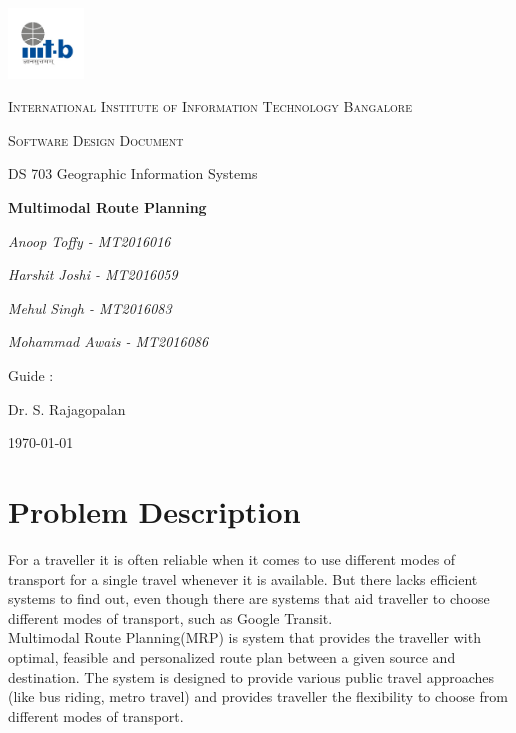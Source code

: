 \documentclass[12pt,a4paper]{article}
\begin{document}
\begin{titlepage}
	\centering
	\includegraphics[width=0.15\textwidth]{IIIT-B_logo.jpg}\par\vspace{1cm}
	{\scshape\LARGE International Institute of Information Technology Bangalore \par}
	\vspace{1cm}
	{\scshape\Large Software Design Document\par}
	{\Large DS 703 Geographic Information Systems\par}
	\vspace{1.5cm}
	{\huge\bfseries Multimodal Route Planning\par}
	\vspace{2cm}	   
	{\Large\itshape Anoop Toffy - MT2016016\par}
	{\Large\itshape Harshit Joshi - MT2016059\par}
	{\Large\itshape Mehul Singh - MT2016083\par}		 	 
	{\Large\itshape Mohammad Awais - MT2016086\par}
	\vfill
	Guide : \par
	Dr. S. Rajagopalan

	\vfill

	{\large \today\par}
\end{titlepage}


\tableofcontents
\listoffigures
\listoftables
\newpage

\section{Problem Description}
For a traveller it is often reliable when it comes to use different modes of transport for a single travel whenever it is available. But there lacks efficient systems to find out, even though there are systems that aid traveller to choose different modes of transport, such as Google Transit. \\
Multimodal Route Planning(MRP) is system that provides the traveller with optimal, feasible and personalized route plan between a given source and destination. The system is designed to provide various public travel approaches (like bus riding, metro travel) and provides traveller the flexibility to choose from different modes of transport.
\end{document}
